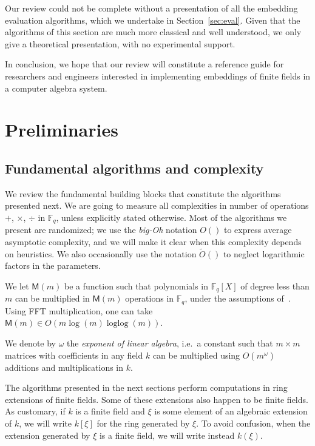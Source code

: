 \documentclass[12pt]{article}
\theoremstyle{plain}
\theoremstyle{definition}
\newcommand{\tildO}{\tilde{O}}
\DeclareMathOperator{\loglog}{loglog}
\def\F{\ensuremath{\mathbb{F}}}
\def\MM{\ensuremath{\mathsf{M}}}
\newcounter{algorithm}
\begin{document}
Our review could not be complete without a presentation of all the
embedding evaluation algorithms, which we undertake in
Section~\ref{sec:eval}. %
Given that the algorithms of this section are much more classical and
well understood, we only give a theoretical presentation, with no
experimental support. %

In conclusion, we hope that our review will constitute a reference
guide for researchers and engineers interested in implementing
embeddings of finite fields in a computer algebra system.


\section{Preliminaries}
\label{sec:preliminaries}

\subsection{Fundamental algorithms and complexity}
We review the fundamental building blocks that constitute the
algorithms presented next.  We are going to measure all complexities
in number of operations $+$, $\times$, $\div$ in $\F_q$, unless
explicitly stated otherwise. Most of the algorithms we present are
randomized; we use the \emph{big-Oh} notation $O()$ to express average
asymptotic complexity, and we will make it clear when this complexity
depends on heuristics. We also occasionally use the notation
$\tildO()$ to neglect logarithmic factors in the parameters.

We let $\MM(m)$ be a function such that polynomials in $\F_q[X]$ of
degree less than $m$ can be multiplied in $\MM(m)$ operations in
$\F_q$, under the assumptions of~\cite[Ch.~8.3]{vzGG}. Using FFT
multiplication, one can take $\MM(m)\in O(m\log (m) \loglog (m))$.

We denote by $\omega$ the \emph{exponent of linear algebra}, i.e.\ a
constant such that $m\times m$ matrices with coefficients in any field
$k$ can be multiplied using $O(m^\omega)$ additions and
multiplications in $k$.

The algorithms presented in the next sections perform computations in
ring extensions of finite fields. Some of these extensions also happen
to be finite fields. As customary, if $k$ is a finite field and $\xi$
is some element of an algebraic extension of $k$, we will write
$k[\xi]$ for the ring generated by $\xi$. To avoid confusion, when the
extension generated by $\xi$ is a finite field, we will write instead
$k(\xi)$.
\end{document}
